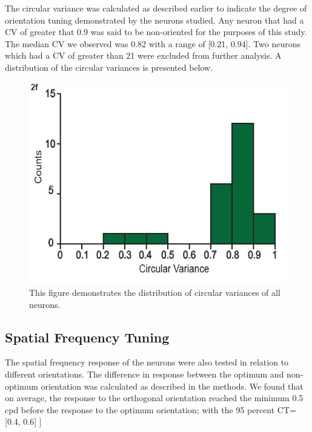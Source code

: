 		The circular variance was calculated as described earlier to indicate the degree of orientation tuning demonstrated by the neurons studied. Any neuron that had a CV of greater that 0.9 was said to be non-oriented for the purposes of this study. The median CV we observed was 0.82 with a range of [0.21, 0.94]. Two neurons which had a CV of greater than 21 were excluded from further analysis. A distribution of the circular variances is presented below.
			\begin{figure}
				\includegraphics[width=\linewidth]{SCCircVar.jpg}
				\caption{This figure demonstrates the distribution of circular
					variances of all neurons.}
				\label{fig:fig4}			
			\end{figure}
		
		
		
	\subsection{Spatial Frequency Tuning}
		The spatial frequency response of the neurons were also tested in relation to different orientations. The difference in response between the optimum and non-optimum orientation was calculated as described in the methods. We found that on average, the response to the orthogonal orientation reached the minimum 0.5 cpd before the response to the optimum orientation; with the 95 percent CT= [0.4, 0.6] ]
		
